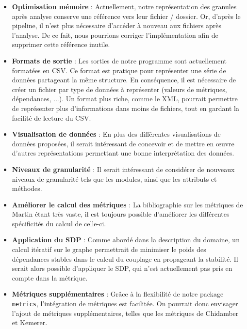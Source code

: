 \documentclass{scrartcl}
\begin{document}
    \begin{itemize}
    
        \item \textbf{Optimisation mémoire} : Actuellement, notre représentation des granules après analyse conserve une référence vers leur fichier / dossier. Or, d'après le pipeline, il n'est plus nécessaire d'accéder à nouveau aux fichiers après l'analyse. De ce fait, nous pourrions corriger l'implémentation afin de supprimer cette référence inutile.
        
        \item \textbf{Formats de sortie} : Les sorties de notre programme sont actuellement formatées en CSV. Ce format est pratique pour représenter une série de données partageant la même structure. En conséquence, il est nécessaire de créer un fichier par type de données à représenter (valeurs de métriques, dépendances, ...). Un format plus riche, comme le XML, pourrait permettre de représenter plus d'informations dans moins de fichiers, tout en gardant la facilité de lecture du CSV.

        \item \textbf{Visualisation de données} : En plus des différentes visualisations de données proposées, il serait intéressant de concevoir et de mettre en œuvre d'autres représentations permettant une bonne interprétation des données.
        
        \item \textbf{Niveaux de granularité} : Il serait intéressant de considérer de nouveaux niveaux de granularité tels que les modules, ainsi que les attributs et méthodes.

        \item \textbf{Améliorer le calcul des métriques} : La bibliographie sur les métriques de Martin étant très vaste, il est toujours possible d'améliorer les différentes spécificités du calcul de celle-ci. 
        
        \item \textbf{Application du SDP} : Comme abordé dans la description du domaine, un calcul itératif sur le graphe permettrait de minimiser le poids des dépendances stables dans le calcul du couplage en propageant la stabilité. Il serait alors possible d'appliquer le SDP, qui n'est actuellement pas pris en compte dans la métrique.
        
        \item \textbf{Métriques supplémentaires} : Grâce à la flexibilité de notre package \texttt{metrics}, l'intégration de métriques est facilitée. On pourrait donc envisager l'ajout de métriques supplémentaires, telles que les métriques de Chidamber et Kemerer.
        

\end{itemize}
\end{document}
